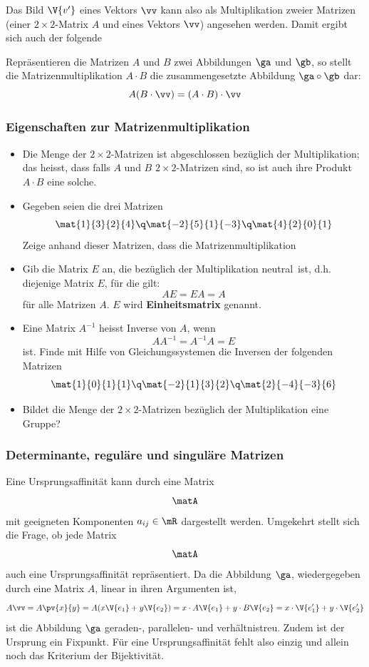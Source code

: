 \documentclass[%
11pt,%
twoside,%
titlepage,%
german,%
headsepline%
]{scrartcl}
\begin{document}
Das Bild $\V{v'}$ eines Vektors $\vv$ kann also als Multiplikation zweier Matrizen (einer $2\times2$-Matrix $A$ und eines Vektors $\vv$) angesehen werden. Damit ergibt sich auch der folgende

\begin{satz}
Repräsentieren die Matrizen $A$ und $B$ zwei Abbildungen $\ga$ und $\gb$, so stellt die
Matrizenmultiplikation $A\cdot B$ die zusammengesetzte Abbildung $\ga\circ\gb$ dar:
$$A(B\cdot\vv)=(A\cdot B)\cdot\vv$$
\end{satz}

\subsubsection{Eigenschaften zur Matrizenmultiplikation}

\begin{itemize}
\item Die Menge der $2\times2$-Matrizen ist abgeschlossen bezüglich der Multiplikation; das heisst, dass falls $A$ und $B$ $2\times2$-Matrizen sind, so ist auch ihre Produkt $A\cdot B$ eine solche.
\item Gegeben seien die drei Matrizen
$$\mat{1}{3}{2}{4}\q\mat{-2}{5}{1}{-3}\q\mat{4}{2}{0}{1}$$
Zeige anhand dieser Matrizen, dass die Matrizenmultiplikation
\item Gib die Matrix $E$ an, die bezüglich der Multiplikation \glqq neutral\grqq\ ist, d.h. diejenige Matrix $E$, für die gilt:
$$AE = EA = A$$
für alle Matrizen $A$. $E$ wird \textbf{Einheitsmatrix} genannt.
\item Eine Matrix $A^{-1}$ heisst Inverse von $A$, wenn
$$AA^{-1} = A^{-1}A = E$$
ist. Finde mit Hilfe von Gleichungssystemen die Inversen der folgenden Matrizen
$$\mat{1}{0}{1}{1}\q\mat{-2}{1}{3}{2}\q\mat{2}{-4}{-3}{6}$$
\item Bildet die Menge der $2\times2$-Matrizen bezüglich der Multiplikation eine Gruppe?
\end{itemize}

\subsubsection{Determinante, reguläre und singuläre Matrizen}

Eine Ursprungsaffinität kann durch eine Matrix
$$\matA$$
mit geeigneten Komponenten $a_{ij}\in\mR$ dargestellt werden. Umgekehrt stellt sich die Frage, ob jede Matrix
$$\matA$$
auch eine Ursprungsaffinität repräsentiert.
Da die Abbildung $\ga$, wiedergegeben durch eine Matrix $A$, linear in ihren Argumenten ist,
$$
A\vv=A\pv{x}{y}=A(x\V{e_1}+y\V{e_2})=x\cdot A\V{e_1}+y\cdot B\V{e_2}=x\cdot\V{e_1'}+y\cdot\V{e_2'}
$$
ist die Abbildung $\ga$ geraden-, parallelen- und verhältnistreu. Zudem ist der Ursprung ein Fixpunkt. Für eine Ursprungsaffinität fehlt also einzig und allein noch das Kriterium der Bijektivität.
\end{document}
